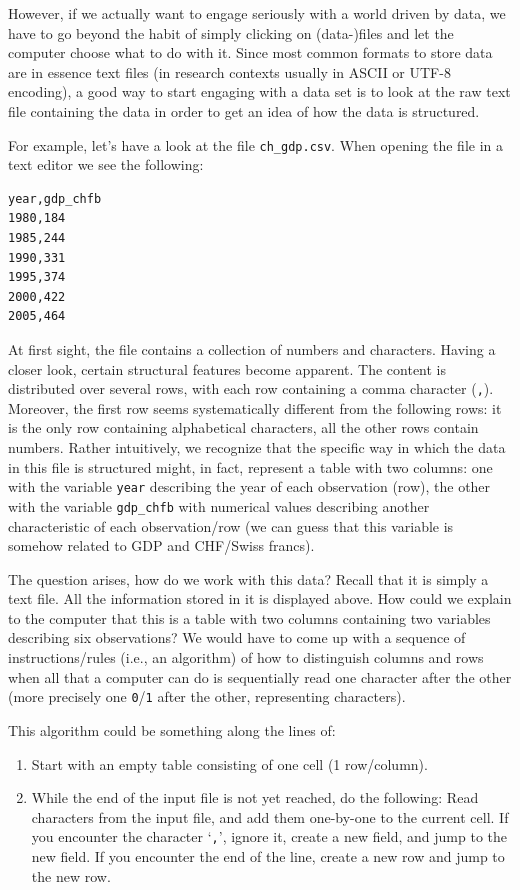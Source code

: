 \documentclass[
  12pt,
]{style/krantz}
\providecommand{\tightlist}{%
  \setlength{\itemsep}{0pt}\setlength{\parskip}{0pt}}
\begin{document}
However, if we actually want to engage seriously with a world driven by data, we have to go beyond the habit of simply clicking on (data-)files and let the computer choose what to do with it. Since most common formats to store data are in essence text files (in research contexts usually in ASCII or UTF-8 encoding), a good way to start engaging with a data set is to look at the raw text file containing the data in order to get an idea of how the data is structured.

For example, let's have a look at the file \texttt{ch\_gdp.csv}. When opening the file in a text editor we see the following:

\begin{verbatim}
year,gdp_chfb
1980,184
1985,244
1990,331
1995,374
2000,422
2005,464
\end{verbatim}

At first sight, the file contains a collection of numbers and characters. Having a closer look, certain structural features become apparent. The content is distributed over several rows, with each row containing a comma character (\texttt{,}). Moreover, the first row seems systematically different from the following rows: it is the only row containing alphabetical characters, all the other rows contain numbers. Rather intuitively, we recognize that the specific way in which the data in this file is structured might, in fact, represent a table with two columns: one with the variable \texttt{year} describing the year of each observation (row), the other with the variable \texttt{gdp\_chfb} with numerical values describing another characteristic of each observation/row (we can guess that this variable is somehow related to GDP and CHF/Swiss francs).

The question arises, how do we work with this data? Recall that it is simply a text file. All the information stored in it is displayed above. How could we explain to the computer that this is a table with two columns containing two variables describing six observations? We would have to come up with a sequence of instructions/rules (i.e., an algorithm) of how to distinguish columns and rows when all that a computer can do is sequentially read one character after the other (more precisely one \texttt{0}/\texttt{1} after the other, representing characters).

This algorithm could be something along the lines of:

\begin{enumerate}
\def\labelenumi{\arabic{enumi}.}
\tightlist
\item
  Start with an empty table consisting of one cell (1 row/column).
\item
  While the end of the input file is not yet reached, do the following:
  Read characters from the input file, and add them one-by-one to the current cell.
  If you encounter the character `\texttt{,}', ignore it, create a new field, and jump to the new field.
  If you encounter the end of the line, create a new row and jump to the new row.
\end{enumerate}
\end{document}
